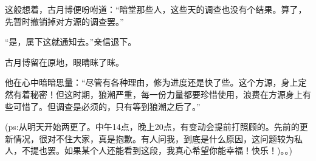 \begin{this_body}
这般想着，古月博便吩咐道：“暗堂那些人，这些天的调查也没有个结果。算了，先暂时撤销掉对方源的调查罢。”

“是，属下这就通知去。”亲信退下。

古月博留在原地，眼睛眯了眯。

他在心中暗暗思量：“尽管有各种理由，修为进度还是快了些。这个方源，身上定然有着秘密！但这时期，狼潮严重，每一份力量都要珍惜使用，浪费在方源身上有些可惜了。但调查是必须的，只有等到狼潮之后了。”

(ps:从明天开始两更了。中午14点，晚上20点，有变动会提前打照顾的。先前的更新情况，很对不住大家，真是抱歉。有人问我，到底是什么原因，这问题较为私人，不提也罢。如果某个人还能看到这段，我真心希望你能幸福！快乐！)。。)

\end{this_body}


